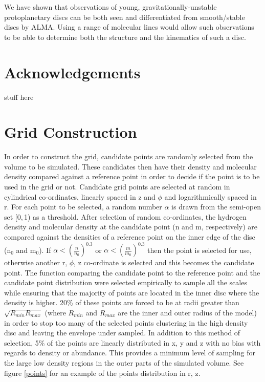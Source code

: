 \documentclass[useAMS,usenatbib]{mn2e}
\begin{document}
We have shown that observations of young, gravitationally-unstable protoplanetary discs can be both seen and differentiated from smooth/stable discs by ALMA. Using a range of molecular lines would allow such observations to be able to determine both the structure and the kinematics of such a disc.

\section*{Acknowledgements}

stuff here
\newpage

\appendix

\section{Grid Construction} \label{sec:gridding} 

In order to construct the grid, candidate points are randomly selected from the volume to be simulated. These candidates then have their density and molecular density compared against a reference point in order to decide if the point is to be used in the grid or not. Candidate grid points are selected at random in cylindrical co-ordinates, linearly spaced in z and $\phi$ and logarithmically spaced in r. For each point to be selected, a random number $\alpha$ is drawn from the semi-open set [0,$\,$1) as a threshold. After selection of random co-ordinates, the hydrogen density and molecular density at the candidate point (n and m, respectively) are compared against the densities of a reference point on the inner edge of the disc (n$_0$ and m$_0$). If $\alpha<\left( \frac{n}{n_0} \right)^{0.3}$ or $\alpha< \left( \frac{m}{m_0} \right)^{0.3}$ then the point is selected for use, otherwise another r, $\phi$, z co-ordinate is selected and this becomes the candidate point. The function comparing the candidate point to the reference point and the candidate point distribution were selected empirically to sample all the scales while ensuring that the majority of points are located in the inner disc where the density is higher. 20\% of these points are forced to be at radii greater than $\sqrt{R_{min}R_{max}}$ (where $R_{min}$ and $R_{max}$ are the inner and outer radius of the model) in order to stop too many of the selected points clustering in the high density disc and leaving the envelope under sampled. In addition to this method of selection, 5\% of the points are linearly distributed in x, y and z with no bias with regards to density or abundance. This provides a minimum level of sampling for the large low density regions in the outer parts of the simulated volume. See figure \ref{points} for an example of the points distribution in r, z. \newline
\end{document}
